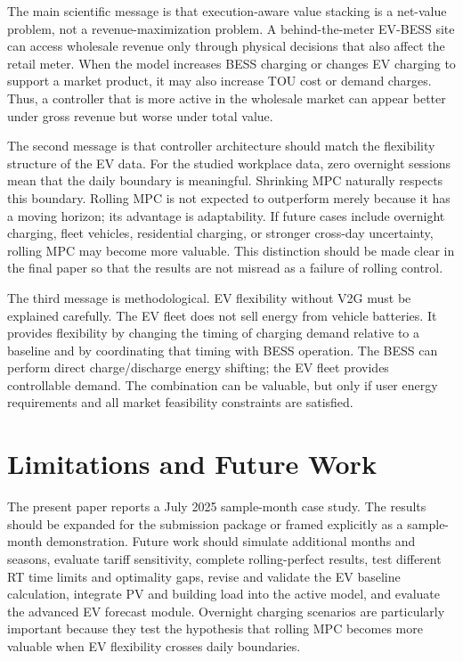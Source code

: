 \documentclass[final,5p,times]{elsarticle}
\begin{document}
The main scientific message is that execution-aware value stacking is a net-value problem, not a revenue-maximization problem. A behind-the-meter EV-BESS site can access wholesale revenue only through physical decisions that also affect the retail meter. When the model increases BESS charging or changes EV charging to support a market product, it may also increase TOU cost or demand charges. Thus, a controller that is more active in the wholesale market can appear better under gross revenue but worse under total value.

The second message is that controller architecture should match the flexibility structure of the EV data. For the studied workplace data, zero overnight sessions mean that the daily boundary is meaningful. Shrinking MPC naturally respects this boundary. Rolling MPC is not expected to outperform merely because it has a moving horizon; its advantage is adaptability. If future cases include overnight charging, fleet vehicles, residential charging, or stronger cross-day uncertainty, rolling MPC may become more valuable. This distinction should be made clear in the final paper so that the results are not misread as a failure of rolling control.

The third message is methodological. EV flexibility without V2G must be explained carefully. The EV fleet does not sell energy from vehicle batteries. It provides flexibility by changing the timing of charging demand relative to a baseline and by coordinating that timing with BESS operation. The BESS can perform direct charge/discharge energy shifting; the EV fleet provides controllable demand. The combination can be valuable, but only if user energy requirements and all market feasibility constraints are satisfied.

\section{Limitations and Future Work}
\label{sec:limitations}

The present paper reports a July 2025 sample-month case study. The results should be expanded for the submission package or framed explicitly as a sample-month demonstration. Future work should simulate additional months and seasons, evaluate tariff sensitivity, complete rolling-perfect results, test different RT time limits and optimality gaps, revise and validate the EV baseline calculation, integrate PV and building load into the active model, and evaluate the advanced EV forecast module. Overnight charging scenarios are particularly important because they test the hypothesis that rolling MPC becomes more valuable when EV flexibility crosses daily boundaries.
\end{document}

